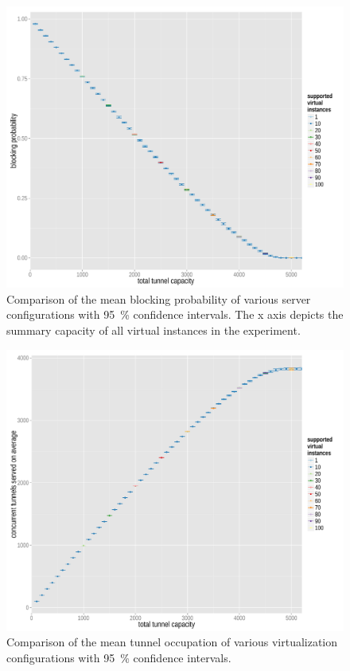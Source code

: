 \begin{figure}[htb]
  \centering
  \includegraphics[width=1.0\textwidth]{images/R-virtualized-blocking.pdf}
  \caption{Comparison of the mean blocking probability of various server configurations with \SI{95}{\percent} confidence intervals. The x axis depicts the summary capacity of all virtual instances in the experiment.}
\label{c4:fig:virtualized_blocking}
\end{figure}

\begin{figure}[htb]
  \centering
  \includegraphics[width=1.0\textwidth]{images/R-virtualized-tunnelusage.pdf}
  \caption{Comparison of the mean tunnel occupation of various virtualization configurations with \SI{95}{\percent} confidence intervals.}
\label{c4:fig:virtualized_tunnelusage}
\end{figure}

